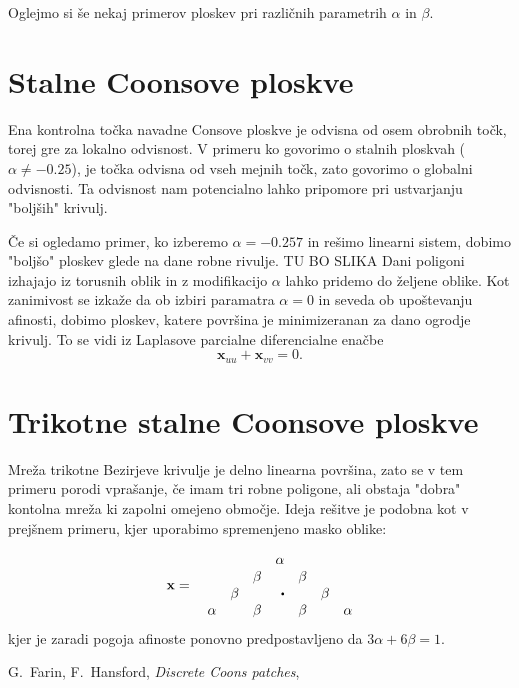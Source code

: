 \documentclass[a4paper,12pt]{article}
\begin{document}
Oglejmo si še nekaj primerov ploskev pri različnih parametrih $\alpha$ in $\beta$.

\section{Stalne Coonsove ploskve}


Ena kontrolna točka navadne Consove ploskve je odvisna od osem obrobnih točk, 
torej gre za lokalno odvisnost. V primeru ko govorimo o stalnih ploskvah 
($\alpha \neq  -0.25$), je točka odvisna od vseh mejnih točk, zato govorimo 
o globalni odvisnosti. Ta odvisnost nam potencialno lahko pripomore pri ustvarjanju 
"boljših" krivulj.

Če si ogledamo primer, ko izberemo $\alpha = -0.257$ in rešimo linearni sistem, dobimo "boljšo"
ploskev glede na dane robne rivulje. 
TU BO SLIKA
Dani poligoni izhajajo iz torusnih oblik in z modifikacijo $\alpha$ lahko pridemo do željene oblike.
Kot zanimivost se izkaže da ob izbiri paramatra $\alpha = 0$ in seveda ob upoštevanju afinosti,
dobimo ploskev, katere površina je minimizeranan za dano ogrodje krivulj. To se vidi iz Laplasove parcialne 
diferencialne enačbe
$$\mathbf{x}_{uu} + \mathbf{x}_{vv} = 0.$$


\section{Trikotne stalne Coonsove ploskve}

Mreža trikotne Bezirjeve krivulje je delno linearna površina, zato se v tem primeru porodi vprašanje,
če imam tri robne poligone, ali obstaja "dobra" kontolna mreža ki zapolni omejeno območje. Ideja rešitve je
podobna kot v prejšnem primeru, kjer uporabimo spremenjeno masko oblike:

$$
\mathbf{x} =  \quad 
\begin{matrix*}[r]
          &       &       & \alpha   &       &       & \\
          &       & \beta &          & \beta &       & \\
          & \beta &       & \sbullet &       & \beta & \\
   \alpha &       & \beta &          & \beta &       & \alpha
\end{matrix*}
$$
kjer je zaradi pogoja afinoste ponovno predpostavljeno da $3\alpha + 6\beta = 1$.




















\newpage


\newpage

\begin{thebibliography}{99}
   G.~Farin, F.~Hansford, \emph{Discrete Coons patches}, 
\end{thebibliography}
\end{document}
